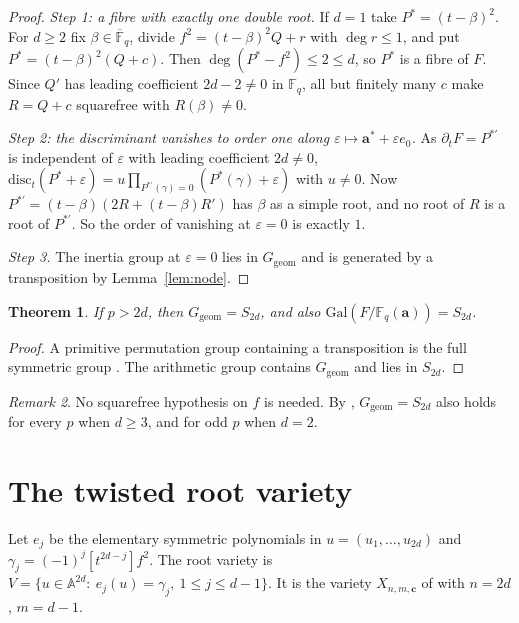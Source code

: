 \documentclass[11pt,a4paper]{article}
\newtheorem{theorem}{Theorem}[section]
\theoremstyle{definition}
\theoremstyle{remark}
\newtheorem{remark}[theorem]{Remark}
\newcommand{\Fq}{\mathbb{F}_q}
\newcommand{\Fqbar}{\overline{\mathbb{F}}_q}
\newcommand{\A}{\mathbb{A}}
\newcommand{\Gal}{\mathrm{Gal}}
\newcommand{\disc}{\mathrm{disc}}
\newcommand{\Ggeom}{G_{\mathrm{geom}}}
\newcommand{\ba}{\mathbf{a}}
\begin{document}
\begin{proof}
\emph{Step 1: a fibre with exactly one double root.} If $d=1$ take $P^\ast=(t-\beta)^2$. For $d\ge2$
fix $\beta\in\Fqbar$, divide $f^2=(t-\beta)^2Q+r$ with $\deg r\le1$, and put $P^\ast=(t-\beta)^2(Q+c)$.
Then $\deg(P^\ast-f^2)\le2\le d$, so $P^\ast$ is a fibre of $F$. Since $Q'$ has leading coefficient
$2d-2\ne0$ in $\Fq$, all but finitely many $c$ make $R=Q+c$ squarefree with $R(\beta)\ne0$.

\emph{Step 2: the discriminant vanishes to order one along $\varepsilon\mapsto\ba^\ast+\varepsilon e_0$.}
As $\partial_tF=P^{\ast\prime}$ is independent of $\varepsilon$ with leading coefficient $2d\ne0$,
$\disc_t(P^\ast+\varepsilon)=u\prod_{P^{\ast\prime}(\gamma)=0}(P^\ast(\gamma)+\varepsilon)$ with $u\neq0$.
Now $P^{\ast\prime}=(t-\beta)(2R+(t-\beta)R')$ has $\beta$ as a simple root, and no root of $R$ is a root
of $P^{\ast\prime}$. So the order of vanishing at $\varepsilon=0$ is exactly $1$.

\emph{Step 3.} The inertia group at $\varepsilon=0$ lies in $\Ggeom$ and is generated by a transposition
by Lemma~\ref{lem:node}.
\end{proof}

\begin{theorem}\label{thm:monodromy}
If $p>2d$, then $\Ggeom=S_{2d}$, and also $\Gal(F/\Fq(\ba))=S_{2d}$.
\end{theorem}

\begin{proof}
A primitive permutation group containing a transposition is the full symmetric group
\cite[Thm.~3.3A]{DM1996}. The arithmetic group contains $\Ggeom$ and lies in $S_{2d}$.
\end{proof}

\begin{remark}
No squarefree hypothesis on $f$ is needed. By \cite[Prop.~3.6]{BBR2015}, $\Ggeom=S_{2d}$ also holds
for every $p$ when $d\ge3$, and for odd $p$ when $d=2$.
\end{remark}

\section{The twisted root variety}\label{sec:twisted}

Let $e_j$ be the elementary symmetric polynomials in $u=(u_1,\dots,u_{2d})$ and
$\gamma_j=(-1)^j[t^{2d-j}]f^2$. The root variety is
$V=\{u\in\A^{2d}:\ e_j(u)=\gamma_j,\ 1\le j\le d-1\}$. It is the variety $X_{n,m,\mathbf c}$ of
\cite{Sawin2021} with $n=2d$, $m=d-1$.
\end{document}
